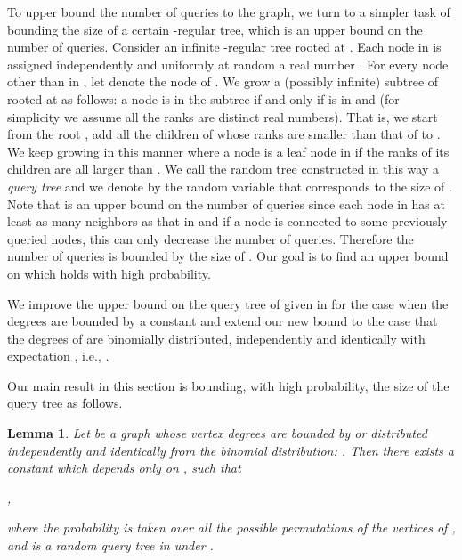 \documentclass[english, oribibl]{llncs}
\newtheorem{lemma}[theorem]{Lemma}
\begin{document}
To upper bound the number of queries to the graph, we turn to a simpler task of bounding the size
of a certain -regular tree, which is an upper bound on the number of queries.
Consider an infinite -regular tree  rooted at .
Each node  in  is assigned independently and uniformly at random a real number
.
For every node  other than  in ,
let  denote the  node of .
We grow a (possibly infinite) subtree  of  rooted at  as follows:
a node  is in the subtree  if and only if  is in  and
 (for simplicity we assume all the ranks are distinct real numbers).
That is, we start from the root , add all the children of  whose ranks are smaller than that
of  to . We keep growing  in this manner where a node  is a leaf node in 
if the ranks of its  children are all larger than .
We call the random tree  constructed in this way a \emph{query tree} and
we denote by  the random variable that corresponds to the size of .
Note that  is an upper bound on the number of queries since
each node in  has at least as many neighbors as that in  and
if a node is connected to some previously queried nodes, this can only decrease
the number of queries. Therefore the number of queries is bounded by the size of .
Our goal is to find an upper bound on  which holds with high probability. 


We improve the upper bound on the query tree of  given in \cite{ARV+11}  for the case when the degrees are bounded by a constant 
and extend our new bound to the case that the degrees of  are binomially distributed, independently and identically with expectation , i.e.,
.


Our main result in this section is bounding, with high probability, the size of the query tree  as follows. 















\begin{lemma}
\label{lemma:boundomial}
Let  be a graph whose vertex degrees are bounded by  or distributed independently and identically from the binomial distribution:  . Then there exists a constant  which depends only on , such that
\begin{center}
,
\end{center}
where the probability is taken over all the possible permutations  of the vertices of , and  is a random query tree in  under .
\end{lemma}
\end{document}

